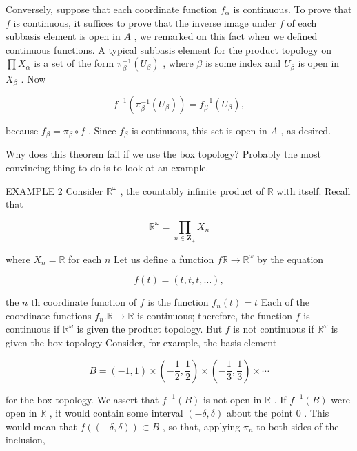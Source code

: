 Conversely, suppose that each coordinate function \({f}_{\alpha }\) is continuous. To prove that \(f\) is continuous, it suffices to prove that the inverse image under \(f\) of each subbasis element is open in \(A\) , we remarked on this fact when we defined continuous functions. A typical subbasis element for the product topology on \(\prod {X}_{\alpha }\) is a set of the form \({\pi }_{\beta }^{-1}\left( {U}_{\beta }\right)\) , where \(\beta\) is some index and \({U}_{\beta }\) is open in \({X}_{\beta }\) . Now

\[
{f}^{-1}\left( {{\pi }_{\beta }^{-1}\left( {U}_{\beta }\right) }\right)  = {f}_{\beta }^{-1}\left( {U}_{\beta }\right) ,
\]

because \({f}_{\beta } = {\pi }_{\beta } \circ  f\) . Since \({f}_{\beta }\) is continuous, this set is open in \(A\) , as desired.

Why does this theorem fail if we use the box topology? Probably the most convincing thing to do is to look at an example.

EXAMPLE 2 Consider \({\mathbb{R}}^{\omega }\) , the countably infinite product of \(\mathbb{R}\) with itself. Recall that

\[
{\mathbb{R}}^{\omega } = \mathop{\prod }\limits_{{n \in  {\mathbf{Z}}_{ + }}}{X}_{n}
\]

where \({X}_{n} = \mathbb{R}\) for each \(n\) Let us define a function \(f\mathbb{R} \rightarrow  {\mathbb{R}}^{\omega }\) by the equation

\[
f\left( t\right)  = \left( {t,t,t,\ldots }\right) ,
\]

the \(n\) th coordinate function of \(f\) is the function \({f}_{n}\left( t\right)  = t\) Each of the coordinate functions \({f}_{n}.\mathbb{R} \rightarrow  \mathbb{R}\) is continuous; therefore, the function \(f\) is continuous if \({\mathbb{R}}^{\omega }\) is given the product topology. But \(f\) is not continuous if \({\mathbb{R}}^{\omega }\) is given the box topology Consider, for example, the basis element

\[
B = \left( {-1,1}\right)  \times  \left( {-\frac{1}{2},\frac{1}{2}}\right)  \times  \left( {-\frac{1}{3},\frac{1}{3}}\right)  \times  \cdots
\]

for the box topology. We assert that \({f}^{-1}\left( B\right)\) is not open in \(\mathbb{R}\) . If \({f}^{-1}\left( B\right)\) were open in \(\mathbb{R}\) , it would contain some interval \(\left( {-\delta ,\delta }\right)\) about the point 0 . This would mean that \(f\left( \left( {-\delta ,\delta }\right) \right)  \subset  B\) , so that, applying \({\pi }_{n}\) to both sides of the inclusion,

